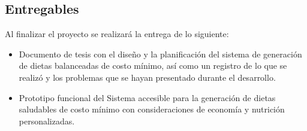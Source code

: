 \subsection{Entregables}
\noindent Al finalizar el proyecto se realizar\'a la entrega de lo siguiente:
\begin{itemize}
    \item Documento de tesis con el dise\~{n}o y la planificaci\'on del sistema de generaci\'on de dietas balanceadas de costo m\'inimo, as\'i como un registro de lo que se realiz\'o y los problemas que se hayan presentado durante el desarrollo.

    \item Prototipo funcional del Sistema accesible para la generaci\'on de dietas saludables de costo m\'inimo con consideraciones de econom\'ia y nutrici\'on personalizadas.

\end{itemize}